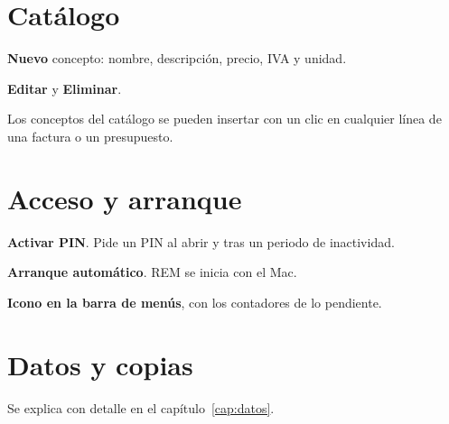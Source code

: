 \section{Catálogo}
\begin{leyenda}
\item[\mk{1}] \textbf{Nuevo} concepto: nombre, descripción, precio, IVA y unidad.
\item[\mk{2}] \textbf{Editar} y  \textbf{Eliminar}.
\end{leyenda}
Los conceptos del catálogo se pueden insertar con un clic en cualquier línea de una factura o un presupuesto.

\section{Acceso y arranque}
\begin{leyenda}
\item[\mk{1}] \textbf{Activar PIN}. Pide un PIN al abrir y tras un periodo de inactividad.
\item[\mk{2}] \textbf{Arranque automático}. REM se inicia con el Mac.
\item[\mk{3}] \textbf{Icono en la barra de menús}, con los contadores de lo pendiente.
\end{leyenda}

\section{Datos y copias}
Se explica con detalle en el capítulo~\ref{cap:datos}.
